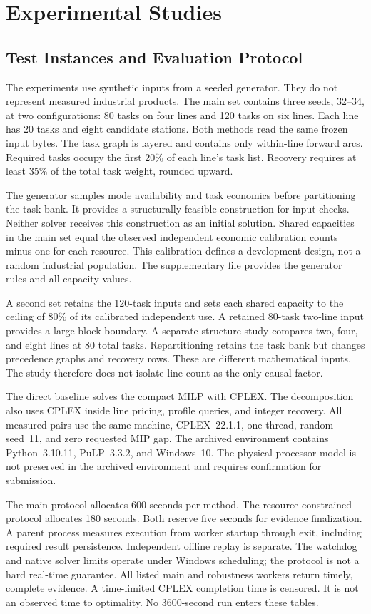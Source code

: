 \section{Experimental Studies}\label{sec:experiments}
\subsection{Test Instances and Evaluation Protocol}
The experiments use synthetic inputs from a seeded generator. They do not represent measured industrial products. The main set contains three seeds, 32--34, at two configurations: 80 tasks on four lines and 120 tasks on six lines. Each line has 20 tasks and eight candidate stations. Both methods read the same frozen input bytes. The task graph is layered and contains only within-line forward arcs. Required tasks occupy the first 20\% of each line's task list. Recovery requires at least 35\% of the total task weight, rounded upward.

The generator samples mode availability and task economics before partitioning the task bank. It provides a structurally feasible construction for input checks. Neither solver receives this construction as an initial solution. Shared capacities in the main set equal the observed independent economic calibration counts minus one for each resource. This calibration defines a development design, not a random industrial population. The supplementary file provides the generator rules and all capacity values.

A second set retains the 120-task inputs and sets each shared capacity to the ceiling of 80\% of its calibrated independent use. A retained 80-task two-line input provides a large-block boundary. A separate structure study compares two, four, and eight lines at 80 total tasks. Repartitioning retains the task bank but changes precedence graphs and recovery rows. These are different mathematical inputs. The study therefore does not isolate line count as the only causal factor.

The direct baseline solves the compact MILP with CPLEX. The decomposition also uses CPLEX inside line pricing, profile queries, and integer recovery. All measured pairs use the same machine, CPLEX~22.1.1, one thread, random seed~11, and zero requested MIP gap. The archived environment contains Python~3.10.11, PuLP~3.3.2, and Windows~10. The physical processor model is not preserved in the archived environment and requires confirmation for submission.

The main protocol allocates 600 seconds per method. The resource-constrained protocol allocates 180 seconds. Both reserve five seconds for evidence finalization. A parent process measures execution from worker startup through exit, including required result persistence. Independent offline replay is separate. The watchdog and native solver limits operate under Windows scheduling; the protocol is not a hard real-time guarantee. All listed main and robustness workers return timely, complete evidence. A time-limited CPLEX completion time is censored. It is not an observed time to optimality. No 3600-second run enters these tables.


